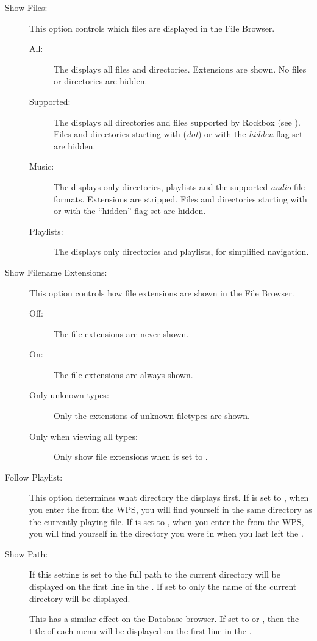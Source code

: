 \begin{description}
  
\item[\label{ref:ShowFiles}Show Files:]
  This option controls which files are displayed in the File Browser.
  \begin{description}
  \item[All:] The  displays all files and directories.
    Extensions are shown. No files or directories are hidden.
  \item[Supported:] The  displays all directories and
    files supported by Rockbox (see ).
    Files and directories starting with  (\emph{dot}) or with the 
    \emph{hidden} flag set are hidden.
  \item[Music:] The  displays only directories, playlists and
    the supported \emph{audio} file formats. Extensions are stripped. Files and
    directories starting with  or with the ``hidden'' flag set are
    hidden.
  \item[Playlists:] The  displays only directories and playlists,
    for simplified navigation.
  \end{description}

\item[\label{ref:ShowExtensions}Show Filename Extensions:]
  This option controls how file extensions are shown in the File Browser.
  \begin{description}
  \item[Off:] The file extensions are never shown.
  \item[On:] The file extensions are always shown.
  \item[Only unknown types:] Only the extensions of unknown filetypes are shown.
  \item[Only when viewing all types:] Only show file extensions when
       is set to .
  \end{description}
  
\item[Follow Playlist:] 
  This option determines what directory the  displays
  first. If  is set to , when you enter
  the  from the WPS, you will find yourself in the same
  directory as the currently playing file. If  is set
  to , when you enter the  from the WPS, you
  will find yourself in the directory you were in when you last left the
  .

\item[Show Path:]
  If this setting is set to  the full path to the current
  directory will be displayed on the first line in the .
  If set to  only the name of the current
  directory will be displayed.
  
  This has a similar effect on the Database browser. If set to
   or , then the title of
  each menu will be displayed on the first line in the .

\end{description}
